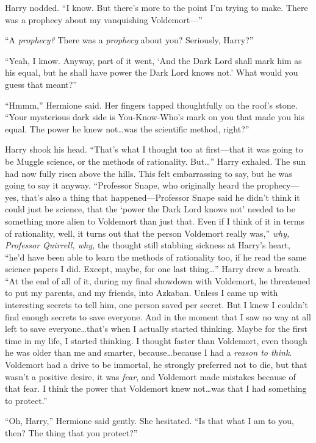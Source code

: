 Harry nodded. “I know. But there’s more to the point I’m trying to make. There was a prophecy about my vanquishing Voldemort—”

“A \emph{prophecy?} There was a \emph{prophecy} about you? Seriously, Harry?”

“Yeah, I know. Anyway, part of it went, ‘And the Dark Lord shall mark him as his equal, but he shall have power the Dark Lord knows not.’ What would you guess that meant?”

“Hmmm,” Hermione said. Her fingers tapped thoughtfully on the roof’s stone. “Your mysterious dark side is You-Know-Who’s mark on you that made you his equal. The power he knew not…was the scientific method, right?”

Harry shook his head. “That’s what I thought too at first—that it was going to be Muggle science, or the methods of rationality. But…” Harry exhaled. The sun had now fully risen above the hills. This felt embarrassing to say, but he was going to say it anyway. “Professor Snape, who originally heard the prophecy—yes, that’s also a thing that happened—Professor Snape said he didn’t think it could just be science, that the ‘power the Dark Lord knows not’ needed to be something more alien to Voldemort than just that. Even if I think of it in terms of rationality, well, it turns out that the person Voldemort really was,” \emph{why, Professor Quirrell, why,} the thought still stabbing sickness at Harry’s heart, “he’d have been able to learn the methods of rationality too, if he read the same science papers I did. Except, maybe, for one last thing…” Harry drew a breath. “At the end of all of it, during my final showdown with Voldemort, he threatened to put my parents, and my friends, into Azkaban. Unless I came up with interesting secrets to tell him, one person saved per secret. But I knew I couldn’t find enough secrets to save everyone. And in the moment that I saw no way at all left to save everyone…that’s when I actually started thinking. Maybe for the first time in my life, I started thinking. I thought faster than Voldemort, even though he was older than me and smarter, because…because I had a \emph{reason to think}. Voldemort had a drive to be immortal, he strongly preferred not to die, but that wasn’t a positive desire, it was \emph{fear}, and Voldemort made mistakes because of that fear. I think the power that Voldemort knew not…was that I had something to protect.”

“Oh, Harry,” Hermione said gently. She hesitated. “Is that what I am to you, then? The thing that you protect?”

